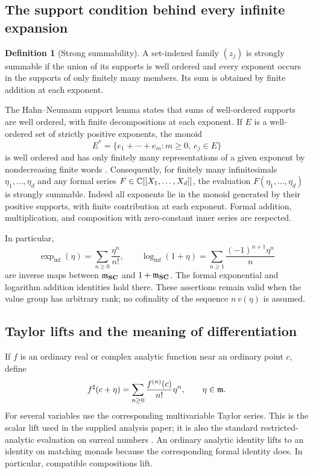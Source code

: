 \documentclass[11pt,letterpaper]{article}
\theoremstyle{definition}
\newtheorem{definition}[theorem]{Definition}
\theoremstyle{remark}
\newcommand{\SC}{\mathbf{SC}}
\newcommand{\sh}{^{\sharp}}
\newcommand{\expi}{\operatorname{exp}_{\mathrm{inf}}}
\newcommand{\logi}{\operatorname{log}_{\mathrm{inf}}}
\numberwithin{equation}{section}
\begin{document}
\subsection{The support condition behind every infinite expansion}
\begin{definition}[Strong summability]
A set-indexed family $(z_j)$ is strongly summable if the union of its supports is well ordered and every exponent occurs in the supports of only finitely many members. Its sum is obtained by finite addition at each exponent.
\end{definition}
The Hahn--Neumann support lemma states that sums of well-ordered supports are well ordered, with finite decompositions at each exponent. If $E$ is a well-ordered set of strictly positive exponents, the monoid
\[
 E^*=\{e_1+\cdots+e_m:m\ge0,\ e_j\in E\}
\]
is well ordered and has only finitely many representations of a given exponent by nondecreasing finite words \cite{Neumann}. Consequently, for finitely many infinitesimals $\eta_1,\ldots,\eta_d$ and any formal series $F\in\mathbb C[[X_1,\ldots,X_d]]$, the evaluation $F(\eta_1,\ldots,\eta_d)$ is strongly summable. Indeed all exponents lie in the monoid generated by their positive supports, with finite contribution at each exponent. Formal addition, multiplication, and composition with zero-constant inner series are respected.

In particular,
\begin{equation}\label{eq:inflogexp}
 \expi(\eta)=\sum_{n\ge0}\frac{\eta^n}{n!},\qquad
 \logi(1+\eta)=\sum_{n\ge1}\frac{(-1)^{n+1}\eta^n}{n}
\end{equation}
are inverse maps between $\mm_{\SC}$ and $1+\mm_{\SC}$. The formal exponential and logarithm addition identities hold there. These assertions remain valid when the value group has arbitrary rank; no cofinality of the sequence $n\,v(\eta)$ is assumed.

\subsection{Taylor lifts and the meaning of differentiation}
If $f$ is an ordinary real or complex analytic function near an ordinary point $c$, define
\begin{equation}\label{eq:lift}
 f\sh(c+\eta)=\sum_{n\ge0}\frac{f^{(n)}(c)}{n!}\eta^n,
 \qquad \eta\in\mm.
\end{equation}
For several variables use the corresponding multivariable Taylor series. This is the scalar lift used in the supplied analysis paper; it is also the standard restricted-analytic evaluation on surreal numbers \cite{InputAnalysis,vdDE}. An ordinary analytic identity lifts to an identity on matching monads because the corresponding formal identity does. In particular, compatible compositions lift.
\end{document}
